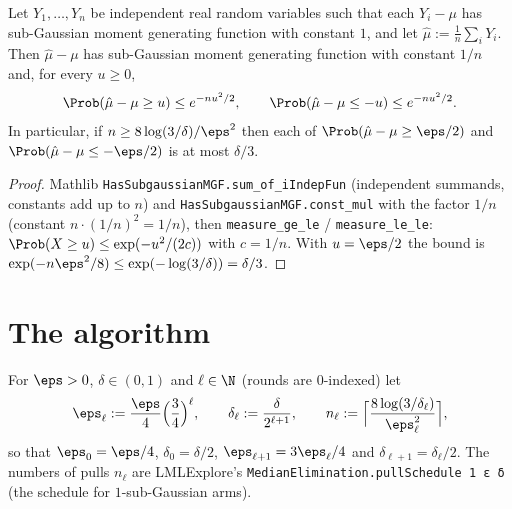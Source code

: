 \begin{lemma}\label{lem:pm_empmean_tail}
\leanok
{}
Let $Y_1,\dots,Y_n$ be independent real random variables such that each $Y_i - \mu$ has
sub-Gaussian moment generating function with constant $1$, and let $\hat\mu := \frac1n\sum_iY_i$.
Then $\hat\mu - \mu$ has sub-Gaussian moment generating function with constant $1/n$ and, for
every $u\ge0$,
\[
  \Prob(\hat\mu - \mu\ge u)\le e^{-nu^2/2},\qquad \Prob(\hat\mu-\mu\le -u)\le e^{-nu^2/2}.
\]
In particular, if $n\ge 8\log(3/\delta)/\eps^2$ then each of $\Prob(\hat\mu-\mu\ge\eps/2)$ and
$\Prob(\hat\mu-\mu\le-\eps/2)$ is at most $\delta/3$.
\end{lemma}

\begin{proof}
\leanok
Mathlib \texttt{HasSubgaussianMGF.sum\_of\_iIndepFun} (independent summands, constants add up to $n$) and
\texttt{HasSubgaussianMGF.const\_mul} with the factor $1/n$ (constant $n\cdot(1/n)^2 = 1/n$),
then \texttt{measure\_ge\_le} / \texttt{measure\_le\_le}: $\Prob(X\ge u)\le\exp(-u^2/(2c))$ with
$c = 1/n$. With $u = \eps/2$ the bound is $\exp(-n\eps^2/8)\le\exp(-\log(3/\delta)) = \delta/3$.
\end{proof}

\section{The algorithm}
\label{sec:pre_median_alg}

\begin{definition}\label{def:me_schedule}
\leanok
For $\eps>0$, $\delta\in(0,1)$ and $\ell\in\N$ (rounds are $0$-indexed) let
\[
  \eps_\ell := \frac{\eps}{4}\Big(\frac34\Big)^\ell,\qquad
  \delta_\ell := \frac{\delta}{2^{\ell+1}},\qquad
  n_\ell := \Big\lceil\frac{8\log(3/\delta_\ell)}{\eps_\ell^2}\Big\rceil ,
\]
so that $\eps_0 = \eps/4$, $\delta_0 = \delta/2$, $\eps_{\ell+1} = 3\eps_\ell/4$ and
$\delta_{\ell+1} = \delta_\ell/2$. The numbers of pulls $n_\ell$ are LMLExplore's
\texttt{MedianElimination.pullSchedule 1 ε δ} (the schedule for $1$-sub-Gaussian arms).
\end{definition}


